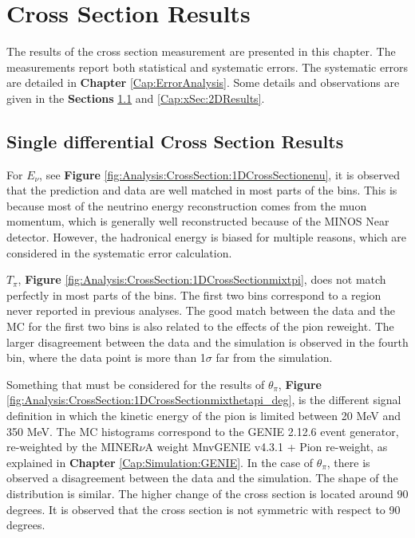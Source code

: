 \chapter{Cross Section Results}
\minitoc
\label{Cap:xSec}

The results of the cross section measurement are presented in this chapter. The measurements report both statistical and systematic errors. The systematic errors are detailed in \textbf{Chapter} \ref{Cap:ErrorAnalysis}. Some details and observations are given in the \textbf{Sections} \ref{Cap:xSec:1DResults} and \ref{Cap:xSec:2DResults}.

\section{Single differential Cross Section Results}
\label{Cap:xSec:1DResults}

For $E_\nu$, see \textbf{Figure} \ref{fig:Analysis:CrossSection:1DCrossSectionenu}, it is observed that the prediction and data are well matched in most parts of the bins. This is because most of the neutrino energy reconstruction comes from the muon momentum, which is generally well reconstructed because of the MINOS Near detector. However, the hadronical energy is biased for multiple reasons, which are considered in the systematic error calculation.  

$T_\pi$, \textbf{Figure} \ref{fig:Analysis:CrossSection:1DCrossSectionmixtpi}, does not match perfectly in most parts of the bins. The first two bins correspond to a region never reported in previous analyses. The good match between the data and the MC for the first two bins is also related to the effects of the pion reweight. The larger disagreement between the data and the simulation is observed in the fourth bin, where the data point is more than 1$\sigma$ far from the simulation.

Something that must be considered for the results of $\theta_\pi$, \textbf{Figure} \ref{fig:Analysis:CrossSection:1DCrossSectionmixthetapi_deg}, is the different signal definition in which the kinetic energy of the pion is limited between 20 MeV and 350 MeV. The MC histograms correspond to the GENIE 2.12.6 event generator, re-weighted by the MINER$\nu$A weight MnvGENIE v4.3.1 + Pion re-weight, as explained in \textbf{Chapter} \ref{Cap:Simulation:GENIE}. In the case of $\theta_\pi$, there is observed a disagreement between the data and the simulation. The shape of the distribution is similar. The higher change of the cross section is located around 90 degrees. It is observed that the cross section is not symmetric with respect to 90 degrees. 

